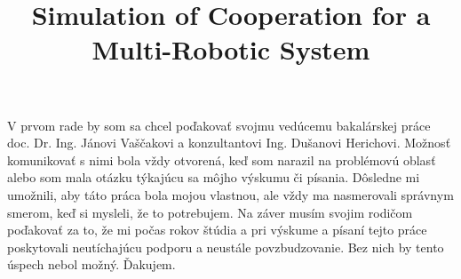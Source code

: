 \documentclass[]{tukediphc}
\title{Simulation of Cooperation for a Multi-Robotic System}
\begin{document}
\renewcommand{\figurename}{Obrázok}	
\renewcommand\theHfigure{\theHsection.\arabic{figure}}
\renewcommand\theHtable{\theHsection.\arabic{table}}

\prvastrana

\titulnastrana 



%
%

\abstraktsk %

\abstrakteng %

\kabstrakt %



\cestnevyhlasenie

\podakovanie
V prvom rade by som sa chcel poďakovať svojmu vedúcemu bakalárskej práce doc. Dr. Ing. Jánovi Vaščakovi a konzultantovi Ing. Dušanovi Herichovi. Možnosť komunikovať s nimi bola vždy otvorená, keď som narazil na problémovú oblasť alebo som mala otázku týkajúcu sa môjho výskumu či písania. Dôsledne mi umožnili, aby táto práca bola mojou vlastnou, ale vždy ma nasmerovali správnym smerom, keď si mysleli, že to potrebujem.
Na záver musím svojim rodičom poďakovať za to, že mi počas rokov štúdia a pri výskume a písaní tejto práce poskytovali neutíchajúcu podporu a neustále povzbudzovanie. Bez nich by tento úspech nebol možný. Ďakujem.
\kpodakovania
\end{document}
